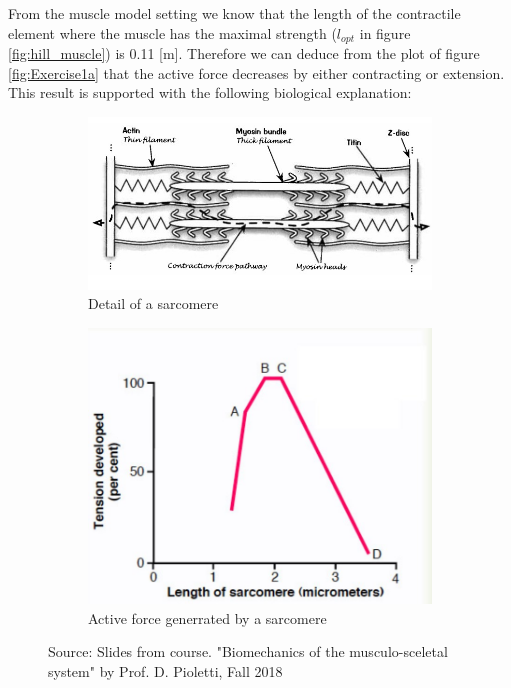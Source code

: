 \documentclass{cmc}
\begin{document}
From the muscle model setting we know that the length of the contractile element where the muscle has the maximal strength ($l_{opt}$ in figure \ref{fig:hill_muscle}) is 0.11 [m]. Therefore we can deduce from the plot of figure \ref{fig:Exercise1a} that the active force decreases by either contracting or extension. This result is supported with the following biological explanation:
\begin{figure}[H]

\centering
\begin{subfigure}[b]{0.49\textwidth}
         \centering
         \includegraphics[width=\textwidth]{figures/Sacromere.jpg}
         \caption{Detail of a sarcomere}
         \label{fig:sarcomere}
     \end{subfigure}
\begin{subfigure}[b]{0.49\textwidth}
         \centering
         \includegraphics[width=\textwidth]{figures/ActiveForce.jpg}
         \caption{Active force generrated by a sarcomere}
         \label{fig:activeforce}
     \end{subfigure}
    
     \caption{Source: Slides from course. "Biomechanics of the musculo-sceletal system" by Prof. D. Pioletti, Fall 2018}
     \label{fig:Exercise1c}
\end{figure}
\end{document}
